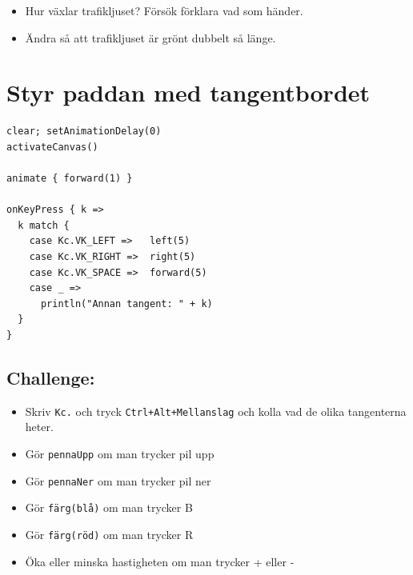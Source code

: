 \begin{itemize}

\item {Hur växlar trafikljuset? Försök förklara vad som händer.}
\item {Ändra så att trafikljuset är grönt dubbelt så länge.}

\end{itemize}


\chapter{Styr paddan med tangentbordet}
\begin{multicols}{2}

\begin{lstlisting}[basicstyle={\ttfamily\fontsize{18}{22}\selectfont},numbers=none]
clear; setAnimationDelay(0)
activateCanvas()

animate { forward(1) }

onKeyPress { k =>
  k match {
    case Kc.VK_LEFT =>   left(5)
    case Kc.VK_RIGHT =>  right(5)
    case Kc.VK_SPACE =>  forward(5)
    case _ => 
      println("Annan tangent: " + k)
  }
}
\end{lstlisting}
        


\columnbreak


\section*{\color{BrickRed}Challenge:}


\begin{itemize}

\item {Skriv \lstinline{Kc.} och tryck \lstinline{Ctrl+Alt+Mellanslag} och kolla vad de olika tangenterna heter.}
\item {Gör \lstinline{pennaUpp} om man trycker pil upp}
\item {Gör \lstinline{pennaNer} om man trycker pil ner}
\item {Gör \lstinline{färg(blå)} om man trycker B}
\item {Gör \lstinline{färg(röd)} om man trycker R}
\item {Öka eller minska hastigheten om man trycker + eller -}

\end{itemize}


\end{multicols}

